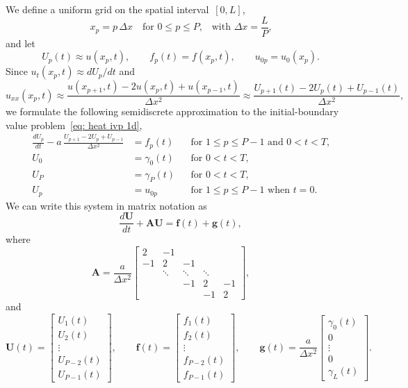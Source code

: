 We define a uniform grid on the spatial interval~$[0,L]$,
\[
x_p=p\,\Delta x\quad\text{for $0\le p\le P$,}
	\quad\text{with $\Delta x=\frac{L}{P}$,}
\]
and let
\[
U_p(t)\approx u(x_p,t),\qquad f_p(t)=f(x_p,t),\qquad u_{0p}=u_0(x_p).
\]
Since $u_t(x_p,t)\approx dU_p/dt$ and
\[
u_{xx}(x_p,t)\approx\frac{u(x_{p+1},t)-2u(x_p,t)+u(x_{p-1},t)}{\Delta x^2}
	\approx\frac{U_{p+1}(t)-2U_p(t)+U_{p-1}(t)}{\Delta x^2},
\]
we formulate the following semidiscrete approximation to the initial-boundary 
value problem~\eqref{eq: heat ivp 1d},
\begin{equation}\label{eq: semidiscrete heat 1d}
\begin{aligned}
\frac{dU_p}{dt}-a\,\frac{U_{p+1}-2U_p+U_{p-1}}{\Delta x^2}&=f_p(t)&
	&\text{for $1\le p\le P-1$ and $0<t<T$,}\\
U_0&=\gamma_0(t)&&\text{for $0<t<T$,}\\
U_P&=\gamma_P(t)&&\text{for $0<t<T$,}\\
U_p&=u_{0p}&&\text{for $1\le p\le P-1$ when $t=0$.}
\end{aligned}
\end{equation}
We can write this system in matrix notation as
\begin{equation}\label{eq: ODE system}
\frac{d\boldsymbol{U}}{dt}+\boldsymbol{A}\boldsymbol{U}=\boldsymbol{f}(t)
	+\boldsymbol{g}(t),
\end{equation}
where
\[
\boldsymbol{A}=\frac{a}{\Delta x^2}\begin{bmatrix}
 2&    -1&      &      &\\
-1&     2&    -1&      &\\
  &\ddots&\ddots&\ddots&\\
  &      &    -1&     2&-1\\
  &      &      &    -1& 2\end{bmatrix},\qquad
\]
and
\[
\boldsymbol{U}(t)=\begin{bmatrix}
U_1(t)\\ U_2(t)\\ \vdots\\ U_{P-2}(t)\\ U_{P-1}(t)\end{bmatrix},\qquad
\boldsymbol{f}(t)=\begin{bmatrix}
f_1(t)\\ f_2(t)\\ \vdots\\ f_{P-2}(t)\\ f_{P-1}(t)\end{bmatrix},\qquad
\boldsymbol{g}(t)=\frac{a}{\Delta x^2}\begin{bmatrix}
\gamma_0(t)\\ 0\\ \vdots\\ 0\\ \gamma_L(t)\end{bmatrix}.
\]
